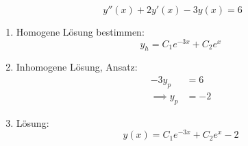 \documentclass[a4paper]{article}
\begin{document}
\begin{multicols}{2}
		\begin{fmerke}[Beispiel mit $g(x) = const$]
			\vspace{1mm}
				$$y''(x) + 2 y'(x) - 3y(x) = 6 $$
			\begin{enumerate}
				\item Homogene Lösung bestimmen: \\
				\vspace{-3mm}
					$$y_h=C_1 e^{-3x} + C_2 e^{x}$$
				\vspace{-8mm}
				\item Inhomogene Lösung, Ansatz: \\
				\vspace{-6mm}
					\begin{align*}
						-3 y_p &= 6\\
						\implies y_p &= -2
					\end{align*}
					\vspace{-8mm}
				\item Lösung: \\
				\vspace{-3mm}
					$$y(x) = C_1 e^{-3x} + C_2 e^{x} - 2$$
					\vspace{-6mm}
			\end{enumerate}
		\end{fmerke}
		

\end{multicols}
\end{document}
